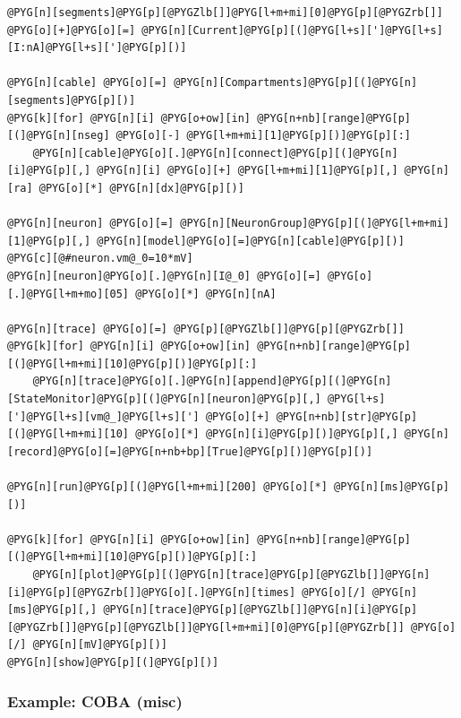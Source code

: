 \documentclass[letterpaper,10pt,english]{manual}
\begin{document}
\begin{Verbatim}[commandchars=@\[\]]
@PYG[n][segments]@PYG[p][@PYGZlb[]]@PYG[l+m+mi][0]@PYG[p][@PYGZrb[]] @PYG[o][+]@PYG[o][=] @PYG[n][Current]@PYG[p][(]@PYG[l+s][']@PYG[l+s][I:nA]@PYG[l+s][']@PYG[p][)]

@PYG[n][cable] @PYG[o][=] @PYG[n][Compartments]@PYG[p][(]@PYG[n][segments]@PYG[p][)]
@PYG[k][for] @PYG[n][i] @PYG[o+ow][in] @PYG[n+nb][range]@PYG[p][(]@PYG[n][nseg] @PYG[o][-] @PYG[l+m+mi][1]@PYG[p][)]@PYG[p][:]
    @PYG[n][cable]@PYG[o][.]@PYG[n][connect]@PYG[p][(]@PYG[n][i]@PYG[p][,] @PYG[n][i] @PYG[o][+] @PYG[l+m+mi][1]@PYG[p][,] @PYG[n][ra] @PYG[o][*] @PYG[n][dx]@PYG[p][)]

@PYG[n][neuron] @PYG[o][=] @PYG[n][NeuronGroup]@PYG[p][(]@PYG[l+m+mi][1]@PYG[p][,] @PYG[n][model]@PYG[o][=]@PYG[n][cable]@PYG[p][)]
@PYG[c][@#neuron.vm@_0=10*mV]
@PYG[n][neuron]@PYG[o][.]@PYG[n][I@_0] @PYG[o][=] @PYG[o][.]@PYG[l+m+mo][05] @PYG[o][*] @PYG[n][nA]

@PYG[n][trace] @PYG[o][=] @PYG[p][@PYGZlb[]]@PYG[p][@PYGZrb[]]
@PYG[k][for] @PYG[n][i] @PYG[o+ow][in] @PYG[n+nb][range]@PYG[p][(]@PYG[l+m+mi][10]@PYG[p][)]@PYG[p][:]
    @PYG[n][trace]@PYG[o][.]@PYG[n][append]@PYG[p][(]@PYG[n][StateMonitor]@PYG[p][(]@PYG[n][neuron]@PYG[p][,] @PYG[l+s][']@PYG[l+s][vm@_]@PYG[l+s]['] @PYG[o][+] @PYG[n+nb][str]@PYG[p][(]@PYG[l+m+mi][10] @PYG[o][*] @PYG[n][i]@PYG[p][)]@PYG[p][,] @PYG[n][record]@PYG[o][=]@PYG[n+nb+bp][True]@PYG[p][)]@PYG[p][)]

@PYG[n][run]@PYG[p][(]@PYG[l+m+mi][200] @PYG[o][*] @PYG[n][ms]@PYG[p][)]

@PYG[k][for] @PYG[n][i] @PYG[o+ow][in] @PYG[n+nb][range]@PYG[p][(]@PYG[l+m+mi][10]@PYG[p][)]@PYG[p][:]
    @PYG[n][plot]@PYG[p][(]@PYG[n][trace]@PYG[p][@PYGZlb[]]@PYG[n][i]@PYG[p][@PYGZrb[]]@PYG[o][.]@PYG[n][times] @PYG[o][/] @PYG[n][ms]@PYG[p][,] @PYG[n][trace]@PYG[p][@PYGZlb[]]@PYG[n][i]@PYG[p][@PYGZrb[]]@PYG[p][@PYGZlb[]]@PYG[l+m+mi][0]@PYG[p][@PYGZrb[]] @PYG[o][/] @PYG[n][mV]@PYG[p][)]
@PYG[n][show]@PYG[p][(]@PYG[p][)]
\end{Verbatim}

\resetcurrentobjects
\hypertarget{--doc-examples-misc_COBA}{}

\hypertarget{index-35}{}\subsubsection{Example: COBA (misc)}
\end{document}
